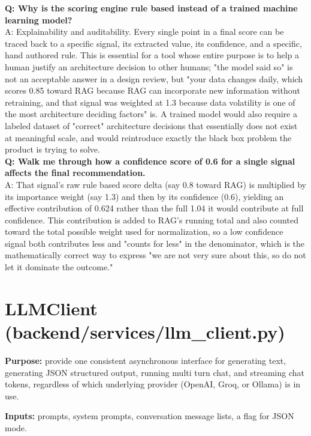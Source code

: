 \documentclass[11pt,a4paper]{report}
\begin{document}
\begin{qabox}
\textbf{Q: Why is the scoring engine rule based instead of a trained machine learning model?} \\
A: Explainability and auditability. Every single point in a final score can be traced back to a specific signal, its extracted value, its confidence, and a specific, hand authored rule. This is essential for a tool whose entire purpose is to help a human justify an architecture decision to other humans; "the model said so" is not an acceptable answer in a design review, but "your data changes daily, which scores 0.85 toward RAG because RAG can incorporate new information without retraining, and that signal was weighted at 1.3 because data volatility is one of the most architecture deciding factors" is. A trained model would also require a labeled dataset of "correct" architecture decisions that essentially does not exist at meaningful scale, and would reintroduce exactly the black box problem the product is trying to solve. \\[4pt]
\textbf{Q: Walk me through how a confidence score of 0.6 for a single signal affects the final recommendation.} \\
A: That signal's raw rule based score delta (say 0.8 toward RAG) is multiplied by its importance weight (say 1.3) and then by its confidence (0.6), yielding an effective contribution of 0.624 rather than the full 1.04 it would contribute at full confidence. This contribution is added to RAG's running total and also counted toward the total possible weight used for normalization, so a low confidence signal both contributes less and "counts for less" in the denominator, which is the mathematically correct way to express "we are not very sure about this, so do not let it dominate the outcome."
\end{qabox}

\section{LLMClient (backend/services/llm\_client.py)}

\textbf{Purpose:} provide one consistent asynchronous interface for generating text, generating JSON structured output, running multi turn chat, and streaming chat tokens, regardless of which underlying provider (OpenAI, Groq, or Ollama) is in use.

\textbf{Inputs:} prompts, system prompts, conversation message lists, a flag for JSON mode.
\end{document}
